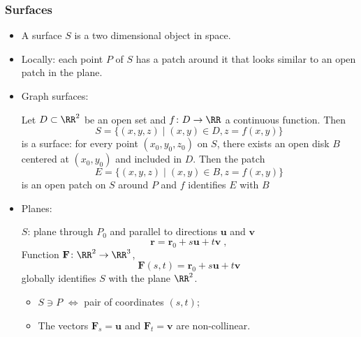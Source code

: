 \begin{frame}
\frametitle{Surfaces}
\begin{itemize}
\item A surface $S$ is a two dimensional object in space.
\item Locally: each point $P$ of $S$ has a patch around it that looks similar to an open patch in the plane.
\item Graph surfaces:

Let $D \subset \RR^2$ be an open set and $f \colon D \to \RR$ a continuous function. Then
%
$$S=\{ (x,y,z) \; | \; (x,y) \in D, z=f(x,y)\}$$
%
is a surface: for every point $(x_0,y_0,z_0)$ on $S$, there exists an open disk $B$ centered at $(x_0,y_0)$ and included in $D$. Then the patch
%
$$E= \{ (x,y,z) \; | \; (x,y) \in B, z=f(x,y)\}$$
%
is an open patch on $S$ around $P$ and $f$ identifies $E$ with $B$
\item Planes:

$S$: plane through $P_0$ and parallel to directions $\textbf{u}$ and $\textbf{v}$
%
$$\textbf{r} = \textbf{r}_0 + s \textbf{u} + t \textbf{v}\; ,$$
%
Function $\textbf{F} \colon \RR^2 \to \RR^3$,
%
$$\textbf{F}(s,t) = \textbf{r}_0 + s \textbf{u} + t \textbf{v}$$
%
globally identifies $S$ with the plane $\RR^2$.
%
\begin{itemize}
  \item  $S \ni P$ $\Longleftrightarrow$  pair of coordinates $(s,t)$;
  \item The vectors $\textbf{F}_s = \textbf{u}$ and $\textbf{F}_t = \textbf{v}$ are non-collinear.
\end{itemize}

\end{itemize}


 

\end{frame}
